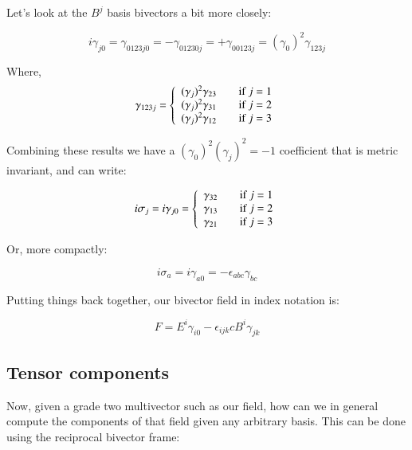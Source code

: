 \documentclass{article}
\begin{document}
Let's look at the $B^j$ basis bivectors a bit more closely:

\begin{equation*}
i\gamma_{j0}
= \gamma_{0123j0}
= -\gamma_{01230j}
= +\gamma_{00123j}
= (\gamma_0)^2 \gamma_{123j}
\end{equation*}

Where,
\begin{equation*}
\gamma_{123j} =
\left\{
\begin{array}{l l}
(\gamma_{j})^2 \gamma_{23} & \quad \mbox{if $j = 1$} \\
(\gamma_{j})^2 \gamma_{31} & \quad \mbox{if $j = 2$} \\
(\gamma_{j})^2 \gamma_{12} & \quad \mbox{if $j = 3$} \\
\end{array} \right.
\end{equation*}

Combining these results we have a $(\gamma_0)^2 (\gamma_{j})^2 = -1$ coefficient that is metric invariant, and can write:

\begin{equation*}
i \sigma_{j} =
i \gamma_{j0} =
\left\{
\begin{array}{l l}
\gamma_{32} & \quad \mbox{if $j = 1$} \\
\gamma_{13} & \quad \mbox{if $j = 2$} \\
\gamma_{21} & \quad \mbox{if $j = 3$} \\
\end{array} \right.
\end{equation*}


Or, more compactly:

\begin{equation*}
i \sigma_{a} =
i \gamma_{a0} =
-\epsilon_{abc} \gamma_{bc}
\end{equation*}

Putting things back together, our bivector field in index notation is:

\begin{equation}\label{eqn:Fcomp}
F = E^i \gamma_{i 0} - \epsilon_{i j k} c B^i \gamma_{j k}
\end{equation}

\subsection{ Tensor components }

Now, given a grade two multivector such as our field, how can we in general compute the components of that field given any arbitrary basis.  This can be done using the reciprocal bivector frame:
\end{document}
